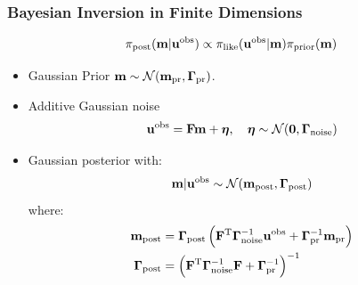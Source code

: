 \documentclass[
  pdf,
  10pt,
  xcolor={svgnames},
]{beamer}
\newcommand{\mc}[1]{\mathcal{#1}}
\newcommand{\T}{\mathrm{T}}
\newcommand{\mat}[1]{\mathbf{{#1}}}
\newcommand{\obs}{\mathbf{u}^{\rm obs}}
\begin{document}
\begin{frame}
  \frametitle{Bayesian Inversion in Finite Dimensions}
  \begin{theorem}
    \[
      \pi_{\rm post}(\vb{m} | \mathbf{u}^{\rm obs})
      \propto
      \pi_{\rm like}(\mathbf{u}^{\rm obs} | \vb{m})
      \pi_{\rm prior}(\vb{m})
    \]
  \end{theorem}
  \begin{itemize}
    \item Gaussian Prior $\vb{m} \sim \mc{N}(\vb{m}_{\rm pr}, \mat{\Gamma}_{\rm pr})$.
    \item Additive Gaussian noise
      \[
        \obs = \mat{F} \vb{m} + \vb*{\eta},
        \quad \vb*{\eta} \sim \mc{N}(\vb{0}, \mat{\Gamma}_{\rm noise})
      \]
    \item Gaussian posterior with:
      \[
        \vb{m} | \mathbf{u}^{\rm obs} 
        \sim \mc{N}(\vb{m}_{\rm post} , \vb{\Gamma}_{\rm post})
      \]
      where:
      \begin{align*}
        \vb{m}_{\rm post}
        &=
        \vb{\Gamma}_{\rm post}
        \left(
          \mat{F}^\T \vb{\Gamma}_{\rm noise}^{-1} \mathbf{u}^{\rm obs}
          + \vb{\Gamma}_{\rm pr}^{-1} \vb{m}_{\rm pr}
        \right) \\
        \vb{\Gamma}_{\rm post}
        &=
        \left(
          \mat{F}^\T \vb{\Gamma}_{\rm noise}^{-1} \mat{F}
          + \vb{\Gamma}_{\rm pr}^{-1}
        \right)^{-1} \\
      \end{align*}
  \end{itemize}
\end{frame}
\end{document}
